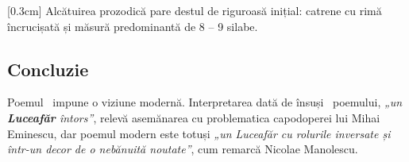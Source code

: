 [0.3cm]
Alcătuirea prozodică pare destul de riguroasă inițial: catrene cu rimă încrucișată și măsură predominantă de 8 -- 9 silabe.


\subsection{Concluzie}

Poemul \operatitle\ impune o viziune modernă. Interpretarea dată de însuși \operaauthor\ poemului, \textit{„un \textbf{Luceafăr} întors”}, relevă asemănarea cu problematica capodoperei lui Mihai Eminescu, dar poemul modern este totuși \textit{„un Luceafăr cu rolurile inversate și într-un decor de o nebănuită noutate”}, cum remarcă Nicolae Manolescu.
